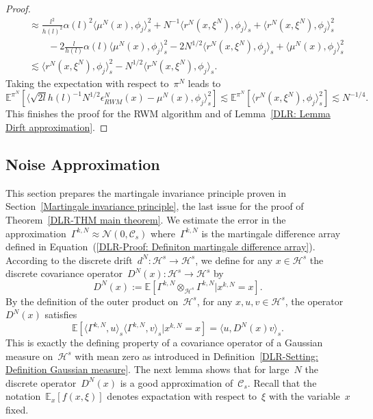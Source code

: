 \begin{proof}
\begin{align*}
   & \quad \approx \frac{l^2}{h(l)^2} \alpha(l)^2 \langle \mu^N (x), \phi_j \rangle_s^2 + N^{-1} \langle r^N(x, \xi^N), \phi_j \rangle_s + \langle r^N(x, \xi^N), \phi_j \rangle_s^2 \\
   & \quad \qquad - 2 \frac{l}{h(l)} \alpha(l) \langle \mu^N (x), \phi_j \rangle_s^2 - 2 N^{1/2} \langle r^N(x, \xi^N), \phi_j \rangle_s + \langle \mu^N (x), \phi_j \rangle_s^2 \\
   & \quad \lesssim \langle r^N(x, \xi^N), \phi_j \rangle_s^2  - N^{1/2} \langle r^N(x, \xi^N), \phi_j \rangle_s.
 \end{align*}
 Taking the expectation with respect to~$\pi^N$ leads to
 \begin{equation*}
   \mathbb{E}^{\pi^N}[ \langle \sqrt{2l}  h(l)^{-1} N^{1/2} \epsilon_{RWM}^N (x) - \mu^N(x) , \phi_j \rangle_s^2 ] \lesssim \mathbb{E}^{\pi^N}[ \langle r^N(x, \xi^N), \phi_j \rangle_s^2] \lesssim N^{-1/4}.
 \end{equation*}
 This finishes the proof for the RWM algorithm and of Lemma~\ref{DLR: Lemma Dirft approximation}.
 
\end{proof}



\subsection{Noise Approximation}
\label{sec:sub:DLR - Noise Approximation}

This section prepares the martingale invariance principle proven in Section~\ref{Martingale invariance principle}, the last issue for the proof of Theorem~\ref{DLR-THM main theorem}. We estimate the error in the approximation~$\Gamma^{k,N} \approx \mathcal{N}(0, \mathcal{C}_s)$ where~$\Gamma^{k,N}$ is the martingale difference array defined in Equation~(\ref{DLR-Proof: Definiton martingale difference array}). According to the discrete drift~$d^N : \mathcal{H}^s \to \mathcal{H}^s$, we define for any $x \in \mathcal{H}^s$ the discrete covariance operator~$D^N(x) : \mathcal{H}^s \to \mathcal{H}^s$ by
\begin{equation*}
  D^N(x) := \mathbb{E}[ \Gamma^{k,N} \otimes_{\mathcal{H}^s} \Gamma^{k,N}| x^{k,N} = x].
\end{equation*}
By the definition of the outer product on~$\mathcal{H}^s$, for any $x, u, v \in \mathcal{H}^s$, the operator~$D^N(x)$ satisfies
\begin{equation*}
  \mathbb{E}[\langle \Gamma^{k,N}, u \rangle_s \langle  \Gamma^{k,N}, v \rangle_s| x^{k,N} = x] = \langle u, D^N(x) v \rangle_s.
\end{equation*}
This is exactly the defining property of a covariance operator of a Gaussian measure on~$\mathcal{H}^s$ with mean zero as introduced in Definition~\ref{DLR-Setting: Definition Gaussian measure}. The next lemma shows that for large~$N$ the discrete operator~$D^N(x)$ is a good approximation of~$\mathcal{C}_s$. Recall that the notation~$\mathbb{E}_x[f(x,\xi)]$ denotes expactation with respect to~$\xi$ with the variable~$x$ fixed. 

